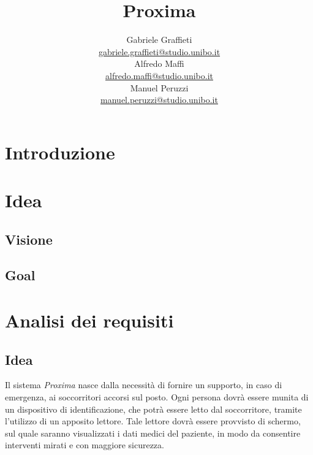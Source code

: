 \documentclass[a4paper,12pt]{report}
\title{\Huge \textbf{Proxima} \\
	\vspace{10pt}
	\vspace{20pt}
}
\author{
	Gabriele Graffieti \\ \small \url{gabriele.graffieti@studio.unibo.it}
	\vspace{15pt}
	\\
	Alfredo Maffi \\ \small \url{alfredo.maffi@studio.unibo.it}
	\vspace{15pt}
	\\
	Manuel Peruzzi \\ \small \url{manuel.peruzzi@studio.unibo.it}
}
\date{}
\begin{document}
\maketitle
{}


\tableofcontents

\chapter{Introduzione}

\chapter{Idea}
\section{Visione}

\section{Goal}
 
\chapter{Analisi dei requisiti} 
\section{Idea}
Il sistema \emph{Proxima} nasce dalla necessità di fornire un supporto, in caso di emergenza, ai soccorritori accorsi sul posto. Ogni persona dovrà essere munita di un dispositivo di identificazione, che potrà essere letto dal soccorritore, tramite l'utilizzo di un apposito lettore. Tale lettore dovrà essere provvisto di schermo, sul quale saranno visualizzati i dati medici del paziente, in modo da consentire interventi mirati e con maggiore sicurezza. 
\end{document}

